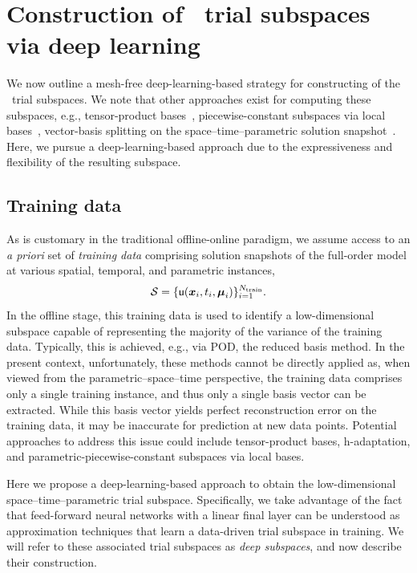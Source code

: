 \documentclass[3p,computermodern,10pt]{elsarticle}
\begin{document}
\section{Construction of \parametricSpaceTimeAcronym\ trial subspaces via deep learning}
We now outline a mesh-free deep-learning-based strategy for constructing of the \parametricSpaceTimeAcronym\ trial subspaces. We note that other approaches exist for computing these subspaces, e.g., tensor-product bases~\cite{choi_stlspg}, piecewise-constant subspaces via local bases~\cite{}, vector-basis splitting on the space--time--parametric solution snapshot~\cite{carlberg_hadaptation,ETTER2020112931}. Here, we pursue a deep-learning-based approach due to the expressiveness and flexibility of the resulting subspace.
\subsection{Training data}
As is customary in the traditional offline-online paradigm, we assume access to an \textit{a priori} set of \textit{training data} comprising solution snapshots of the full-order model at various spatial, temporal, and parametric instances,
$$\mathcal{S} = \{\mathsf{u}(\boldsymbol x_i,t_i,\boldsymbol \mu_i) \}_{i=1}^{N_{\text{train}}}.$$ 
In the offline stage, this training data is used to identify a low-dimensional subspace capable of representing the majority of the variance of the training data. Typically, this is achieved, e.g., via POD, the reduced basis method. 
In the present context, unfortunately, these methods cannot be directly applied as, when viewed from the parametric--space--time perspective, the training data comprises only a single training instance, and thus only a single basis vector can be extracted. While this basis vector yields perfect reconstruction error on the training data, it may be inaccurate for prediction at new data points. Potential approaches to address this issue could include tensor-product bases, h-adaptation, and parametric-piecewise-constant subspaces via local bases. 

Here we propose a deep-learning-based approach to obtain the low-dimensional space--time--parametric trial subspace. Specifically, we take advantage of the fact that feed-forward neural networks with a linear final layer can be understood as approximation techniques that learn a data-driven trial subspace in training. We will refer to these associated trial subspaces as \textit{deep subspaces}, and now describe their construction. 
\end{document}
